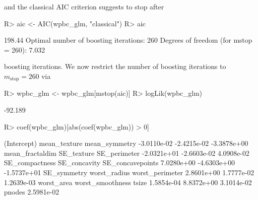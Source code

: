 \documentclass{article}
\newcommand{\Robject}[1]{\texttt{#1}}
\newenvironment{Schunk}{}{}
\begin{document}
and the classical AIC criterion suggests to stop after
\begin{Schunk}
\begin{Sinput}
R> aic <- AIC(wpbc_glm, "classical")
R> aic
\end{Sinput}
\begin{Soutput}
[1] 198.44
Optimal number of boosting iterations: 260 
Degrees of freedom (for mstop = 260): 7.032 
\end{Soutput}
\end{Schunk}
boosting iterations. 
We now restrict the number of boosting iterations to 
$m_\text{stop} = 260$ via
\begin{Schunk}
\begin{Sinput}
R> wpbc_glm <- wpbc_glm[mstop(aic)]
R> logLik(wpbc_glm)
\end{Sinput}
\begin{Soutput}
[1] -92.189
\end{Soutput}
\begin{Sinput}
R> coef(wpbc_glm)[abs(coef(wpbc_glm)) > 0]
\end{Sinput}
\begin{Soutput}
     (Intercept)     mean_texture    mean_symmetry 
     -3.0110e-02      -2.4215e-02      -3.3878e+00 
 mean_fractaldim       SE_texture     SE_perimeter 
     -2.0321e+01      -2.6603e-02       4.0908e-02 
  SE_compactness     SE_concavity SE_concavepoints 
      7.0280e+00      -4.6303e+00      -1.5737e+01 
     SE_symmetry     worst_radius  worst_perimeter 
      2.8601e+00       1.7777e-02       1.2639e-03 
      worst_area worst_smoothness            tsize 
      1.5854e-04       8.8372e+00       3.1014e-02 
          pnodes 
      2.5981e-02 
\end{Soutput}
\end{Schunk}
\end{document}

